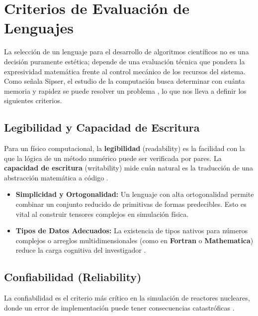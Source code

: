 
\section{Criterios de Evaluación de Lenguajes}
\label{sec:1_2_criterios_evaluacion}

La selección de un lenguaje para el desarrollo de algoritmos científicos no es una decisión puramente estética; depende de una evaluación técnica que pondera la expresividad matemática frente al control mecánico de los recursos del sistema. Como señala Sipser, el estudio de la computación busca determinar con cuánta memoria y rapidez se puede resolver un problema \cite{sipser2012introduction}, lo que nos lleva a definir los siguientes criterios.

\subsection{Legibilidad y Capacidad de Escritura}

Para un físico computacional, la \textbf{legibilidad} (readability) es la facilidad con la que la lógica de un método numérico puede ser verificada por pares. La \textbf{capacidad de escritura} (writability) mide cuán natural es la traducción de una abstracción matemática a código \cite{sebesta2019concepts}.

\begin{itemize}
    \item \textbf{Simplicidad y Ortogonalidad:} Un lenguaje con alta ortogonalidad permite combinar un conjunto reducido de primitivas de formas predecibles. Esto es vital al construir tensores complejos en simulación física.
    \item \textbf{Tipos de Datos Adecuados:} La existencia de tipos nativos para números complejos o arreglos multidimensionales (como en \textbf{Fortran} o \textbf{Mathematica}) reduce la carga cognitiva del investigador \cite{sebesta2019concepts}.
\end{itemize}

\subsection{Confiabilidad (Reliability)}

La confiabilidad es el criterio más crítico en la simulación de reactores nucleares, donde un error de implementación puede tener consecuencias catastróficas \cite{sebesta2019concepts}.

